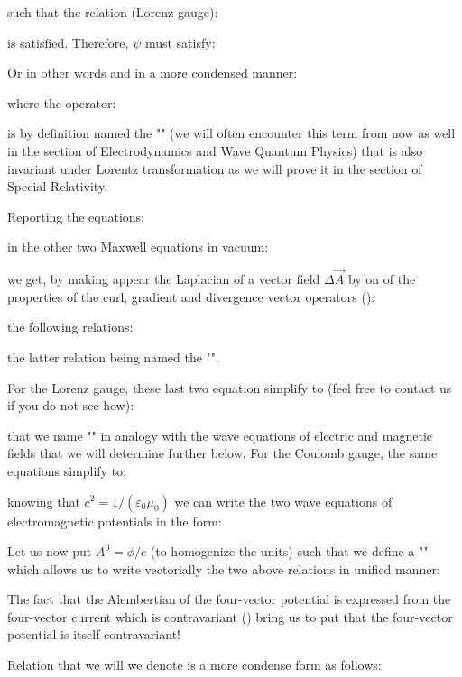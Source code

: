 	such that the relation (Lorenz gauge):
	
	is satisfied. Therefore, $\psi$ must satisfy:
	
	Or in other words and in a more condensed manner:
	
	where the operator:
	
	is by definition named the "\label{alembertian}" (we will often encounter this term from now as well in the section of Electrodynamics and Wave Quantum Physics) that is also invariant under Lorentz transformation as we will prove it in the section of Special Relativity.
	
	Reporting the equations:
	
	in the other two Maxwell equations in vacuum:
	
	we get, by making appear the Laplacian of a vector field $\Delta \vec{A}$ by on of the properties of the curl, gradient and divergence vector operators ():
	
	the following relations:
	
	the latter relation being named the "".
	
	For the Lorenz gauge, these last two equation simplify to (feel free to contact us if you do not see how):
	
	that we name "" in analogy with the wave equations of electric and magnetic fields that we will determine further below.
	For the Coulomb gauge, the same equations simplify to:
	
	knowing that $c^2=1/(\varepsilon_0\mu_0)$ we can write the two wave equations of electromagnetic potentials in the form:
	
	Let us now put $A^0=\phi/c$ (to homogenize the units) such that we define a "" which allows us to write vectorially the two above relations in unified manner:
	 
	\begin{tcolorbox}[title=Remark,colframe=black,arc=10pt]
	The fact that the Alembertian of the four-vector potential  is expressed from the four-vector current which is contravariant () bring us to put that the four-vector potential is itself contravariant!
	\end{tcolorbox}
	Relation that we will we denote is a more condense form as follows:
	
